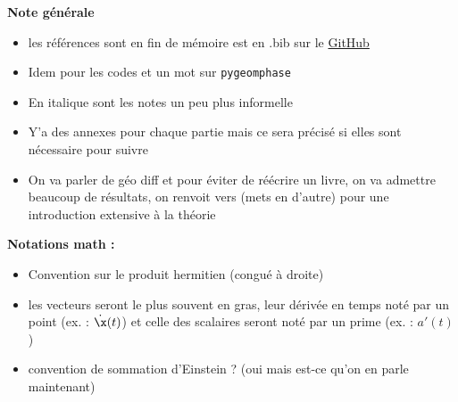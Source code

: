 	
	
	
	
	
	


\textbf{Note générale}
\begin{itemize}
	
	\item les références sont en fin de mémoire est en .bib sur le \href{https://github.com/GregoireDoat/StageM2}{GitHub}
	
	\item Idem pour les codes et un mot sur \texttt{pygeomphase}
	
	\item En italique sont les notes un peu plus informelle
	
	\item Y'a des annexes pour chaque partie mais ce sera précisé si elles sont nécessaire pour suivre
	
	\item On va parler de géo diff et pour éviter de réécrire un livre, on va admettre beaucoup de résultats, on renvoit vers \cite{lafontaine_introduction_2015} (mets en d'autre) pour une introduction extensive à la théorie
	
\end{itemize}
\skipl

\textbf{Notations math :}
\begin{itemize}
	
	\item Convention sur le produit hermitien (congué à droite)
	
	\item les vecteurs seront le plus souvent en gras, leur dérivée en temps noté par un point (ex. : $\dot{\x}(t)$) et celle des scalaires seront noté par un prime (ex. : $a'(t)$)
	
	\item convention de sommation d'Einstein ? (oui mais est-ce qu'on en parle maintenant)
\end{itemize}
\skipl



